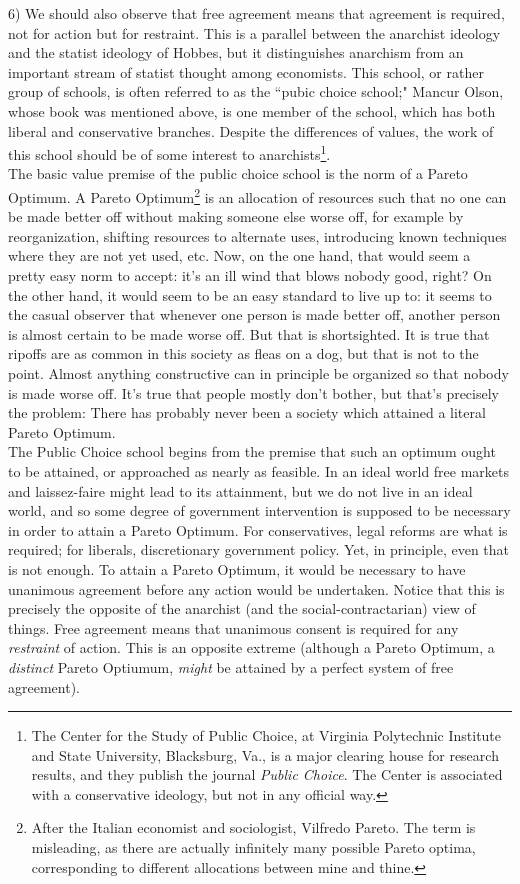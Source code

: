 \documentclass[12pt, onecolumn, letterpaper, oneside]{book}
\begin{document}
6) We should also observe that free agreement means that agreement is required, not for action but for restraint. This is a parallel between the anarchist ideology and the statist ideology of Hobbes, but it distinguishes anarchism from an important stream of statist thought among economists. This school, or rather group of schools, is often referred to as the ``pubic choice school;" Mancur Olson, whose book was mentioned above, is one member of the school, which has both liberal and conservative branches. Despite the differences of values, the work of this school should be of some interest to anarchists\footnote{The Center for the Study of Public Choice, at Virginia Polytechnic Institute and State University, Blacksburg, Va., is a major clearing house for research results, and they publish the journal \emph{Public Choice}. The Center is associated with a conservative ideology, but not in any official way.}.\\
The basic value premise of the public choice school is the norm of a Pareto Optimum. A Pareto Optimum\footnote{After the Italian economist and sociologist, Vilfredo Pareto. The term is misleading, as there are actually infinitely many possible Pareto optima, corresponding to different allocations between mine and thine.} is an allocation of resources such that no one can be made better off without making someone else worse off, for example by reorganization, shifting resources to alternate uses, introducing known techniques where they are not yet used, etc. Now, on the one hand, that would seem a pretty easy norm to accept: it's an ill wind that blows nobody good, right? On the other hand, it would seem to be an easy standard to live up to: it seems to the casual observer that whenever one person is made better off, another person is almost certain to be made worse off. But that is shortsighted. It is true that ripoffs are as common in this society as fleas on a dog, but that is not to the point. Almost anything constructive can in principle be organized so that nobody is made worse off. It's true that people mostly don't bother, but that's precisely the problem: There has probably never been a society which attained a literal Pareto Optimum.\\
The Public Choice school begins from the premise that such an optimum ought to be attained, or approached as nearly as feasible. In an ideal world free markets and laissez-faire might lead to its attainment, but we do not live in an ideal world, and so some degree of government intervention is supposed to be necessary in order to attain a Pareto Optimum. For conservatives, legal reforms are what is required; for liberals, discretionary government policy. Yet, in principle, even that is not enough. To attain a Pareto Optimum, it would be necessary to have unanimous agreement before any action would be undertaken. Notice that this is precisely the opposite of the anarchist (and the social-contractarian) view of things. Free agreement means that unanimous consent is required for any \emph{restraint} of action. This is an opposite extreme (although a Pareto Optimum, a \emph{distinct} Pareto Optiumum, \emph{might} be attained by a perfect system of free agreement).\\
\end{document}
